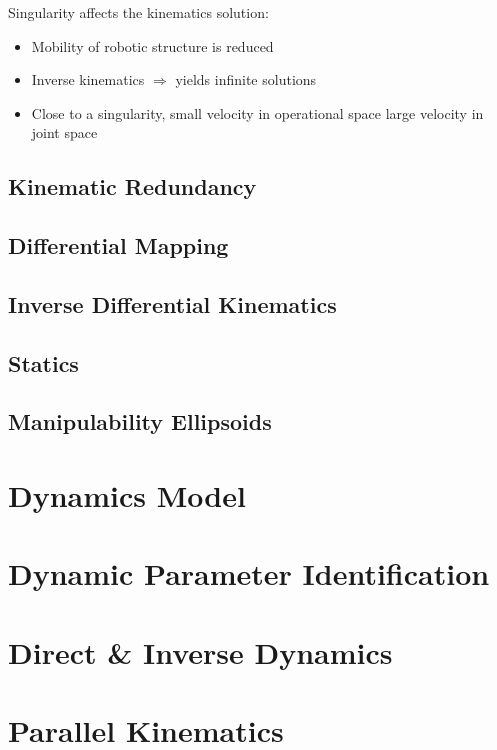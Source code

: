 Singularity affects the kinematics solution:
\begin{itemize}
	\item Mobility of robotic structure is reduced
	\item Inverse kinematics $\Rightarrow$ yields infinite solutions
	\item Close to a singularity, small velocity in operational space  large velocity in joint space
\end{itemize}


\subsection{Kinematic Redundancy}
\subsection{Differential Mapping}
\subsection{Inverse Differential Kinematics}
\subsection{Statics}

\subsection{Manipulability Ellipsoids}

\section{Dynamics Model}
\section{Dynamic Parameter Identification}
\section{Direct \& Inverse Dynamics}
\section{Parallel Kinematics}